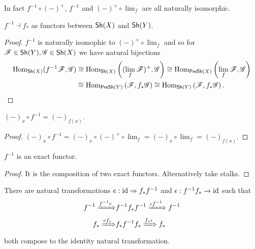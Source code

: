 \documentclass{memoir}
\begin{document}
\begin{remark}
    In fact $f^{-1} \circ (-)^+$, $f^{-1}$ and $(-)^+\circ \lim_f$ are all naturally isomorphic.
\end{remark}
\begin{corollary}
    $f^{-1}\dashv f_*$ as functors between ${\normalfont\mathsf{Sh}}(X)$ and ${\normalfont\mathsf{Sh}}(Y)$.
\end{corollary}
\begin{proof}
    $f^{-1}$ is naturally isomophic to $(-)^+\circ \lim_f$ and so for $\mathscr{F}\in{\normalfont\mathsf{Sh}}(Y),\mathscr{G}\in{\normalfont\mathsf{Sh}}(X)$ we have natural bijections
    \begin{align}
        \operatorname{Hom}_{{\normalfont\mathsf{Sh}}(X)}(f^{-1}\mathscr{F},\mathscr{G}) &\cong \operatorname{Hom}_{{\normalfont\mathsf{Sh}}(X)}\left((\lim_f\mathscr{F})^+,\mathscr{G}\right) \cong \operatorname{Hom}_{{\normalfont\mathsf{PreSh}}(X)}\left(\lim_f\mathscr{F},\mathscr{G}\right) \nonumber \\
                                             &\cong \operatorname{Hom}_{{\normalfont\mathsf{PreSh}}(Y)}\left(\mathscr{F},f_*\mathscr{G}\right) \cong \operatorname{Hom}_{{\normalfont\mathsf{Sh}}(Y)}\left(\mathscr{F},f_*\mathscr{G}\right).
    \end{align}
\end{proof}
\begin{corollary}
    $(-)_x\circ f^{-1} = (-)_{f(x)}$.
\end{corollary}
\begin{proof}
    $(-)_x\circ f^{-1} = (-)_x \circ (-)^+ \circ \lim_f = (-)_x \circ \lim_f = (-)_{f(x)}$.
\end{proof}
\begin{corollary}
    $f^{-1}$ is an exact functor.
\end{corollary}
\begin{proof}
    It is the composition of two exact functors.
    Alternatively take stalks.
\end{proof}
\begin{corollary}
    There are natural transformations $e:\operatorname{id}\Rightarrow f_*f^{-1}$ and $\epsilon: f^{-1}f_*\to \operatorname{id}$ such that 
    \begin{align}
        f^{-1}\xRightarrow{f^{-1}e} &f^{-1}f_*f^{-1} \xRightarrow{\epsilon f^{-1}} f^{-1} \\
        f_*\xRightarrow{ef_*} &f_*f^{-1}f_* \xRightarrow{f_*\epsilon} f_*
    \end{align}
    both compose to the identity natural transformation.
\end{corollary}
\end{document}
